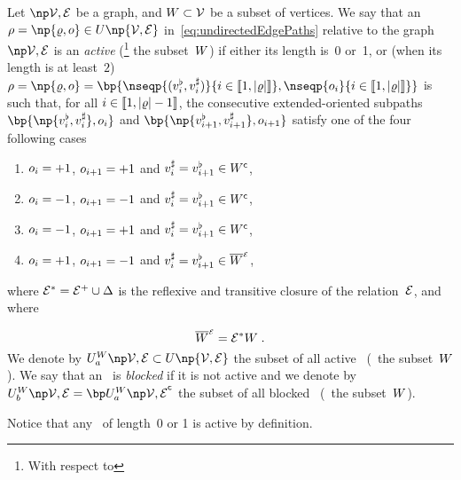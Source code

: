 \documentclass[12pt]{article}
\begin{document}
{{{{{\begin{definition}
  \label{de:ActivePaths}
  Let \( \npOrientedGraph \) be a graph, 
  and $W\subset{\cal V}$ be a subset of vertices.
  We say that an  \undirectedEdgePath\
  \(\UndirectedPath=\np{\path,\orient} \in
  \UPATH\np{\OrientedGraph} \) in~\eqref{eq:undirectedEdgePaths}
  relative to the graph~\(\npOrientedGraph\)
  is an \emph{active \undirectedEdgePath} (\wrt\footnote{With respect to} the subset~$W$)
  if %
  either its length is~0 or~1,
  or (when its length is at least~$2$)
  \(\UndirectedPath=\np{\path,\orient}=\bp{\nseqp{(\tail{\vertex_i},\head{\vertex_i})}{i \in
      \ic{1,\cardinal{\path}}},\nseqp{\orient_i}{i \in \ic{1,\cardinal{\path}}}}\)
  is such that, for all $i\in \llbracket 1,{\lvert \varrho \rvert}-1 \rrbracket$, the consecutive extended-oriented subpaths
  \(\bp{\np{\tail{\vertex_i},\head{\vertex_i}}, \orient_i}\)  and
  \(\bp{\np{\tail{\vertex_{i+1}},\head{\vertex_{i+1}}}, \orient_{i+1}}\)
  satisfy one of the four following cases
  \begin{enumerate}
  \item
    $o_i = +1$, $o_{i+1}= +1$ and $v_i^{\sharp} = v_{i+1}^{\flat} \in W^{\mathsf{c}}$,
    \label{it:ActivePaths_case1}
  \item
    $o_i = -1$, $o_{i+1}= -1$ and $v_i^{\sharp} = v_{i+1}^{\flat} \in W^{\mathsf{c}}$,
    \label{it:ActivePaths_case2}
  \item
    $o_i = -1$, $o_{i+1}= +1$ and $v_i^{\sharp} = v_{i+1}^{\flat} \in W^{\mathsf{c}}$,
    \label{it:ActivePaths_case3}
  \item
    $o_i = +1$, $o_{i+1}= -1$ and $v_i^{\sharp} = v_{i+1}^{\flat} \in \overline{W}^{\text{\tiny ${\cal E}$}}$,
    \label{it:ActivePaths_case4}
  \end{enumerate}
  where \( {\cal E}^{*}= {\cal E}^{+} \cup \Delta \)
  is the reflexive and transitive closure of the relation~${\cal E}$,
  and where
  
  \begin{equation}
    \overline{W}^{\text{\tiny ${\cal E}$}}=
    {\cal E}^{*}W 
    \; .
    \label{eq:TransitiveReflexiveClosure_AgentSubsetW}
  \end{equation}
  We denote by \( \ActiveUndirectedPaths{\OrientedGraph} \subset \UPATH\np{\OrientedGraph}\)
  the subset of all active \undirectedEdgePaths\ (\wrt\ the subset~$W$). 
  We say that an \undirectedEdgePath\ is \emph{blocked} if it is not active
  and we denote by \( \BlockedUndirectedPaths{\OrientedGraph} = 
  \bpComplementary{\ActiveUndirectedPaths{\OrientedGraph}}\)   
  the subset of all blocked \undirectedEdgePaths\ (\wrt\ the subset~$W$).
\end{definition} 
Notice that any \undirectedEdgePath\ of length~0 or 1 is active by definition.

}}}}}
\end{document}
